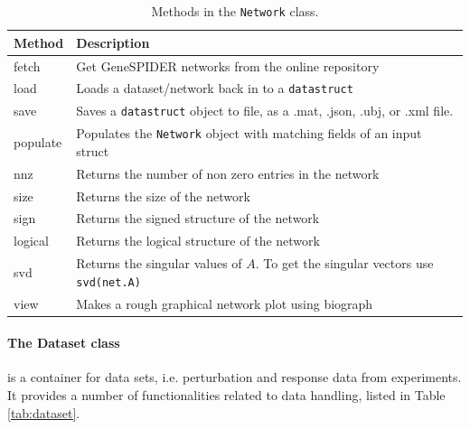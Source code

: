 \begin{bibunit}
\begin{table}[htb]
\caption{\label{tab:network_class}
Methods in the \texttt{Network} class.}
\centering
\begin{tabular}{|l|p{10cm}|}
\hline
Method & Description\\
\hline
fetch & Get GeneSPIDER networks from the online repository\\
load & Loads a dataset/network back in to a \texttt{datastruct}\\
save & Saves a \texttt{datastruct} object to file, as a .mat, .json, .ubj, or .xml file.\\
populate & Populates the \texttt{Network} object with matching fields of an input struct\\
nnz & Returns the number of non zero entries in the network\\
size & Returns the size of the network\\
sign & Returns the signed structure of the network\\
logical & Returns the logical structure of the network\\
svd & Returns the singular values of \(A\). To get the singular vectors use \texttt{svd(net.A)}\\
view & Makes a rough graphical network plot using biograph\\
\hline
\end{tabular}
\end{table}


\paragraph{The Dataset class}
\label{sec:dataset_class}
is a container for data sets, i.e. perturbation and response data from experiments.
It provides a number of functionalities related to data handling, listed in Table \ref{tab:dataset}.


\end{bibunit}
